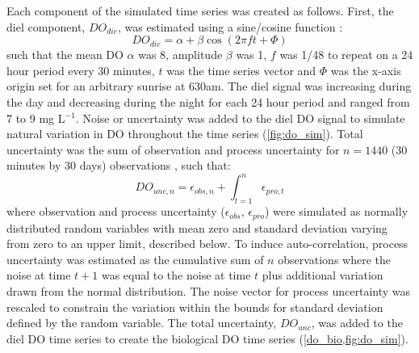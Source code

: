 \documentclass[letterpaper,12pt,oneside]{article}\usepackage[]{graphicx}\usepackage[]{color}
\begin{document}
Each component of the simulated time series was created as follows.  First, the diel component, $DO_{die}$, was estimated using a sine/cosine function \citep{Cryer08}:
\begin{equation} \label{do_sin}
DO_{die} = \alpha + \beta\cos\left(2\pi ft + \Phi\right)
\end{equation}
such that the mean DO $\alpha$ was 8, amplitude $\beta$ was 1, $f$ was 1/48 to repeat on a 24 hour period every 30 minutes, $t$ was the time series vector and $\Phi$ was the x-axis origin set for an arbitrary sunrise at 630am.  The diel signal was increasing during the day and decreasing during the night for each 24 hour period and ranged from 7 to 9 mg L$^{-1}$.  Noise or uncertainty was added to the diel \ac{DO} signal to simulate natural variation in \ac{DO} throughout the time series (\cref{fig:do_sim}).  Total uncertainty was the sum of observation and process uncertainty for $n = 1440$ (30 minutes by 30 days) observations \citep{Hilborn97}, such that:
\begin{equation} \label{do_unc_n}
DO_{unc, n} = \epsilon_{obs, n} + \int_{t = 1}^{n} \epsilon_{pro, t}
\end{equation}
where observation and process uncertainty ($\epsilon_{obs}$, $\epsilon_{pro}$) were simulated as normally distributed random variables with mean zero and standard deviation varying from zero to an upper limit, described below.  To induce auto-correlation, process uncertainty was estimated as the cumulative sum of $n$ observations where the noise at time $t+1$ was equal to the noise at time $t$ plus additional variation drawn from the normal distribution.  The noise vector for process uncertainty was rescaled to constrain the variation within the bounds for standard deviation defined by the random variable. The total uncertainty, $DO_{unc}$, was added to the diel \ac{DO} time series to create the biological \ac{DO} time series (\cref{do_bio,fig:do_sim}).
\end{document}
